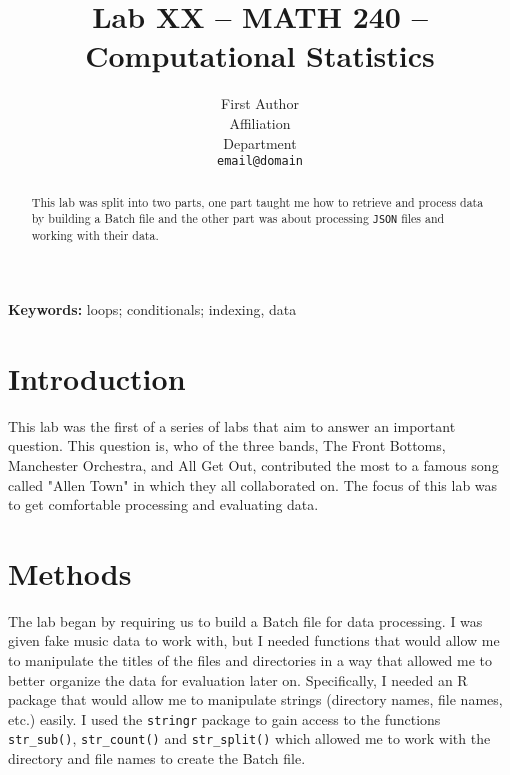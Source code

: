 \documentclass{article}\usepackage[]{graphicx}\usepackage[]{xcolor}
\begin{document}
\vspace{-1in}
\title{Lab XX -- MATH 240 -- Computational Statistics}

\author{
  First Author \\
  Affiliation  \\
  Department  \\
  {\tt email@domain}
}

\date{}

\maketitle

\begin{multicols}{2}
\begin{abstract}
This lab was split into two parts, one part taught me how to retrieve and process data by building a Batch file and the other part was about processing \texttt{JSON} files and working with their data. 
\end{abstract}

\noindent \textbf{Keywords:} loops; conditionals; indexing, data

\section{Introduction}

This lab was the first of a series of labs that aim to answer an important question. This question is, who of the three bands, The Front Bottoms, Manchester Orchestra, and All Get Out, contributed the most to a famous song called "Allen Town" in which they all collaborated on. The focus of this lab was to get comfortable processing and evaluating data.


\section{Methods}
The lab began by requiring us to build a Batch file for data processing. I was given fake music data to work with, but I needed functions that would allow me to manipulate the titles of the files and directories in a way that allowed me to better organize the data for evaluation later on. Specifically, I needed an R package that would allow me to manipulate strings (directory names, file names, etc.) easily. I used the \texttt{stringr} package to gain access to the functions \texttt{str\_sub()}, \texttt{str\_count()} and \texttt{str\_split()} which allowed me to work with the directory and file names to create the Batch file. \\


\end{multicols}
\end{document}
